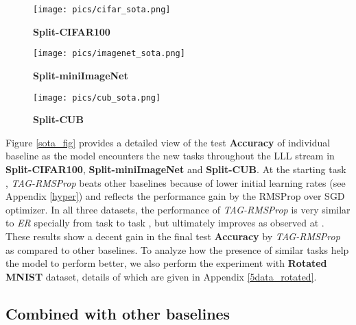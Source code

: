 \documentclass{article} \usepackage{collas2022_conference,times}
\begin{document}
    \begin{figure*}[t!]
        \centering
        \begin{subfigure}[b]{0.3\textwidth}
            \texttt{[image: pics/cifar\_sota.png]}
            \caption{\textbf{Split-CIFAR100}}
        \end{subfigure}
        \hfill
        \begin{subfigure}[b]{0.3\textwidth}
            \texttt{[image: pics/imagenet\_sota.png]}
            \caption{\textbf{Split-miniImageNet}}
        \end{subfigure}
        \hfill
        \begin{subfigure}[b]{0.3\textwidth}
            \texttt{[image: pics/cub\_sota.png]}
            \caption{\textbf{Split-CUB}}
        \end{subfigure}
        \caption{Evolution of average test \textbf{Accuracy (\%)}  for different existing methods and \textit{TAG-RMSProp} throughout the stream in \textbf{Split-CIFAR100}, \textbf{Split-miniImageNet} and \textbf{Split-CUB}. All results are averaged across 5 runs and the shaded area represent standard deviation. Performing similar as \textit{ER} for major part of the stream, \textit{TAG-RMSProp} always results in the highest final accuracy as compared to other methods with a low standard deviation.}
        \label{sota_fig}
    \end{figure*}

    Figure \ref{sota_fig} provides a detailed view of the test \textbf{Accuracy} of individual baseline as the model encounters the new tasks throughout the LLL stream in \textbf{Split-CIFAR100}, \textbf{Split-miniImageNet} and \textbf{Split-CUB}. At the starting task , \textit{TAG-RMSProp} beats other baselines because of lower initial learning rates (see Appendix \ref{hyper}) and reflects the performance gain by the RMSProp over SGD optimizer. In all three datasets, the performance of \textit{TAG-RMSProp} is very similar to \textit{ER} specially from task  to task , but ultimately improves as observed at . These results show a decent gain in the final test \textbf{Accuracy} by \textit{TAG-RMSProp} as compared to other baselines. To analyze how the presence of similar tasks help the model to perform better, we also perform the experiment with \textbf{Rotated MNIST} \citep{lopez2017gradient} dataset, details of which are given in Appendix \ref{5data_rotated}.




\subsection{Combined with other baselines}\label{tag_base_opt}
\end{document}

